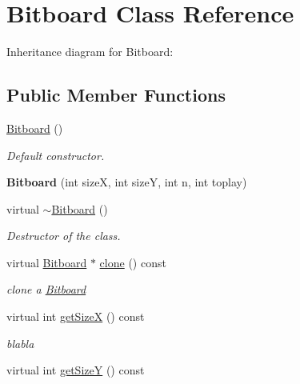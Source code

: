 \hypertarget{class_bitboard}{\section{Bitboard Class Reference}
\label{class_bitboard}
}


Inheritance diagram for Bitboard\+:
\subsection*{Public Member Functions}
\begin{DoxyCompactItemize}
\item 
\hyperlink{class_bitboard_adf47222b0cd401b3ec6c762a953fadf1}{Bitboard} ()
\begin{DoxyCompactList}\small\item\em Default constructor. \end{DoxyCompactList}\item 
\hypertarget{class_bitboard_a0ac711788ecfa14aa749c03efe70e391}{{\bfseries Bitboard} (int size\+X, int size\+Y, int n, int toplay)}\label{class_bitboard_a0ac711788ecfa14aa749c03efe70e391}

\item 
\hypertarget{class_bitboard_ad2688925653206f405e9e456c87a3142}{virtual \hyperlink{class_bitboard_ad2688925653206f405e9e456c87a3142}{$\sim$\+Bitboard} ()}\label{class_bitboard_ad2688925653206f405e9e456c87a3142}

\begin{DoxyCompactList}\small\item\em Destructor of the class. \end{DoxyCompactList}\item 
\hypertarget{class_bitboard_a0e8d35fe97c43f0be6a3ba87182dfaa4}{virtual \hyperlink{class_bitboard}{Bitboard} $\ast$ \hyperlink{class_bitboard_a0e8d35fe97c43f0be6a3ba87182dfaa4}{clone} () const }\label{class_bitboard_a0e8d35fe97c43f0be6a3ba87182dfaa4}

\begin{DoxyCompactList}\small\item\em clone a \hyperlink{class_bitboard}{Bitboard} \end{DoxyCompactList}\item 
\hypertarget{class_bitboard_a76d89521ceebcbcb1e97b7bdd55d0dcd}{virtual int \hyperlink{class_bitboard_a76d89521ceebcbcb1e97b7bdd55d0dcd}{get\+Size\+X} () const }\label{class_bitboard_a76d89521ceebcbcb1e97b7bdd55d0dcd}

\begin{DoxyCompactList}\small\item\em blabla \end{DoxyCompactList}\item 
\hypertarget{class_bitboard_aab3ba31561f533aa12965a0e868f4cf9}{virtual int \hyperlink{class_bitboard_aab3ba31561f533aa12965a0e868f4cf9}{get\+Size\+Y} () const }\label{class_bitboard_aab3ba31561f533aa12965a0e868f4cf9}


\end{DoxyCompactItemize}
